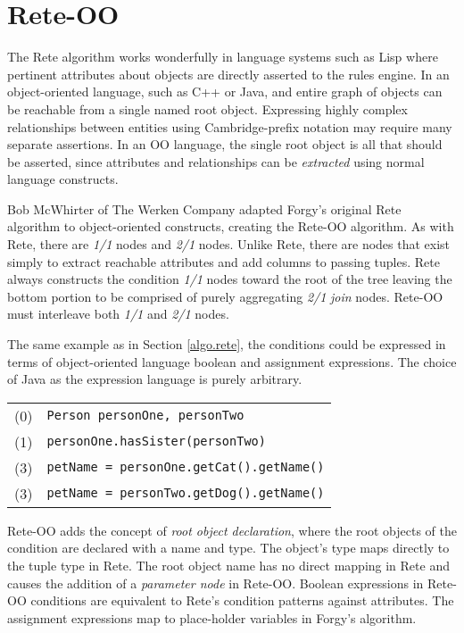 \section{Rete-OO}

The Rete algorithm works wonderfully in language systems 
such as Lisp where pertinent attributes about objects 
are directly asserted to the rules engine.  In an
object-oriented language, such as C++ or Java, and entire 
graph of objects can be reachable from a single named 
root object.  Expressing highly complex relationships between
entities using Cambridge-prefix notation may require many
separate assertions.  In an OO language, the single root
object is all that should be asserted, since attributes 
and relationships can be \emph{extracted} using normal
language constructs.

Bob McWhirter of The Werken Company adapted
Forgy's original Rete
algorithm to object-oriented constructs, creating the Rete-OO algorithm.
As with Rete, there are \emph{1/1} nodes and \emph{2/1}
nodes.  Unlike Rete, there are nodes that exist simply 
to extract reachable attributes and add columns to passing
tuples. Rete always constructs the condition \emph{1/1} nodes toward
the root of the tree leaving the bottom portion to be 
comprised of purely aggregating \emph{2/1} \emph{join} nodes.  
Rete-OO must interleave both \emph{1/1} and \emph{2/1} nodes.

The same example as in Section \ref{algo.rete}, 
the conditions could be expressed in terms of object-oriented
language boolean and assignment expressions.  The choice
of Java as the expression language is purely arbitrary.

\medskip

\begin{tabular}{cl}
(0) & \texttt{Person personOne, personTwo} \\
(1) & \texttt{personOne.hasSister(personTwo)} \\
(3) & \texttt{petName = personOne.getCat().getName()} \\
(3) & \texttt{petName = personTwo.getDog().getName()} \\
\end{tabular}

\bigskip

Rete-OO adds the concept of \emph{root object declaration}, where 
the root objects of the condition are declared with a
name and type.  The object's type maps directly to the
tuple type in Rete.  The root object name has no direct
mapping in Rete and causes the addition of a \emph{parameter node}
in Rete-OO.  Boolean expressions in Rete-OO conditions are
equivalent to Rete's condition patterns against attributes.
The assignment expressions map to place-holder variables in
Forgy's algorithm.

